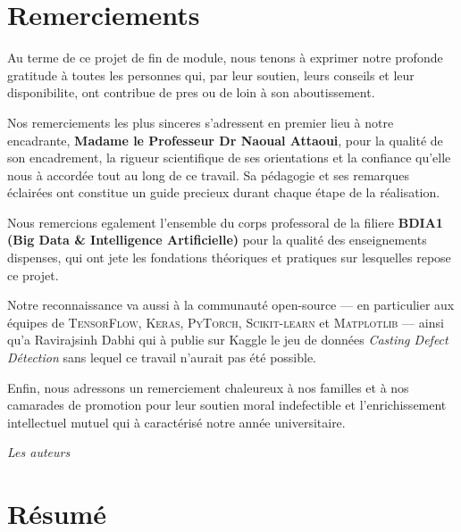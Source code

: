 \documentclass[12pt,a4paper,openany]{report}
\begin{document}
\chapter*{Remerciements}
\thispagestyle{fancy}

Au terme de ce projet de fin de module, nous tenons à exprimer notre profonde gratitude à toutes les personnes qui, par leur soutien, leurs conseils et leur disponibilite, ont contribue de pres ou de loin à son aboutissement.

Nos remerciements les plus sinceres s'adressent en premier lieu à notre encadrante, \textbf{Madame le Professeur Dr Naoual Attaoui}, pour la qualité de son encadrement, la rigueur scientifique de ses orientations et la confiance qu'elle nous à accordée tout au long de ce travail. Sa pédagogie et ses remarques éclairées ont constitue un guide precieux durant chaque étape de la réalisation.

Nous remercions egalement l'ensemble du corps professoral de la filiere \textbf{BDIA1 (Big Data \& Intelligence Artificielle)} pour la qualité des enseignements dispenses, qui ont jete les fondations théoriques et pratiques sur lesquelles repose ce projet.

Notre reconnaissance va aussi à la communauté open-source --- en particulier aux équipes de \textsc{TensorFlow}, \textsc{Keras}, \textsc{PyTorch}, \textsc{Scikit-learn} et \textsc{Matplotlib} --- ainsi qu'a Ravirajsinh Dabhi qui à publie sur Kaggle le jeu de données \emph{Casting Defect Détection} sans lequel ce travail n'aurait pas été possible.

Enfin, nous adressons un remerciement chaleureux à nos familles et à nos camarades de promotion pour leur soutien moral indefectible et l'enrichissement intellectuel mutuel qui à caractérisé notre année universitaire.

\vspace{1.5cm}
\hfill\textit{Les auteurs}

\chapter*{Résumé}
\thispagestyle{fancy}
\end{document}
